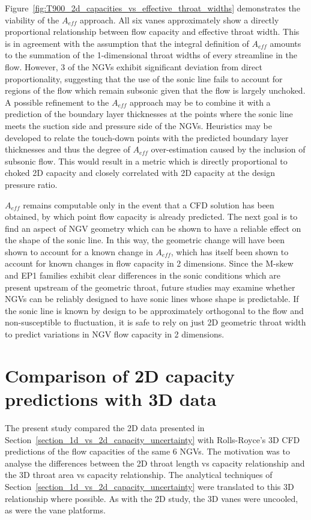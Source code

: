 \documentclass[a4paper, 11pt, oneside]{report}
\begin{document}
Figure~\ref{fig:T900_2d_capacities_vs_effective_throat_widths} demonstrates the viability of the $A_{eff}$ approach. All six vanes approximately show a directly proportional relationship between flow capacity and effective throat width. This is in agreement with the assumption that the integral definition of $A_{eff}$ amounts to the summation of the 1-dimensional throat widths of every streamline in the flow. However, 3 of the NGVs exhibit significant deviation from direct proportionality, suggesting that the use of the sonic line fails to account for regions of the flow which remain subsonic given that the flow is largely unchoked. A possible refinement to the $A_{eff}$ approach may be to combine it with a prediction of the boundary layer thicknesses at the points where the sonic line meets the suction side and pressure side of the NGVs. Heuristics may be developed to relate the touch-down points with the predicted boundary layer thicknesses and thus the degree of $A_{eff}$ over-estimation caused by the inclusion of subsonic flow. This would result in a metric which is directly proportional to choked 2D capacity and closely correlated with 2D capacity at the design pressure ratio.

$A_{eff}$ remains computable only in the event that a CFD solution has been obtained, by which point flow capacity is already predicted. The next goal is to find an aspect of NGV geometry which can be shown to have a reliable effect on the shape of the sonic line. In this way, the geometric change will have been shown to account for a known change in $A_{eff}$, which has itself been shown to account for known changes in flow capacity in 2 dimensions. Since the M-skew and EP1 families exhibit clear differences in the sonic conditions which are present upstream of the geometric throat, future studies may examine whether NGVs can be reliably designed to have sonic lines whose shape is predictable. If the sonic line is known by design to be approximately orthogonal to the flow and non-susceptible to fluctuation, it is safe to rely on just 2D geometric throat width to predict variations in NGV flow capacity in 2 dimensions.


\section{Comparison of 2D capacity predictions with 3D data}
\label{2d_vs_3d_capacity_uncertainty}

The present study compared the 2D data presented in Section~\ref{section_1d_vs_2d_capacity_uncertainty} with Rolls-Royce's 3D CFD predictions of the flow capacities of the same 6 NGVs. The motivation was to analyse the differences between the 2D throat length vs capacity relationship and the 3D throat area vs capacity relationship. The analytical techniques of Section~\ref{section_1d_vs_2d_capacity_uncertainty} were translated to this 3D relationship where possible. As with the 2D study, the 3D vanes were uncooled, as were the vane platforms.
\end{document}
